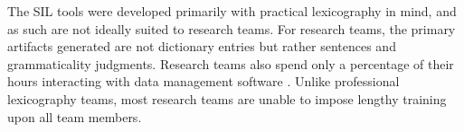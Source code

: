 \documentclass[11pt]{article}
\newcommand{\smalltodo}[2][]
    {\todo[caption={#2}, #1]
    {\tiny#2\normalsize}}
\begin{document}
The SIL tools were developed primarily with practical 
lexicography in mind, and as such are not ideally suited to research teams. For
research teams, the primary artifacts generated are not dictionary entries but
rather sentences and grammaticality judgments.  Research teams also spend only
a percentage of their hours interacting with data management software
\cite{Butler:2007,rogers10,robinson07}. Unlike professional lexicography teams,
most research teams are unable to impose lengthy training upon all team members.%

 
\end{document}
